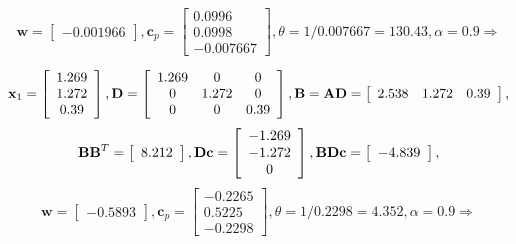 \documentclass{article}
\begin{document}
\begin{enumerate}
\begin{itemize}
\begin{displaymath}
				\end{displaymath}
				\begin{displaymath}
					\mathbf{w} = \left[ \begin{array}{c} -0.001966 \end{array} \right], \mathbf{c}_p = \left[ \begin{array}{r} 0.0996 \\ 0.0998 \\ -0.007667 \end{array} \right], \theta = 1/0.007667 = 130.43, \alpha = 0.9 \Rightarrow
				\end{displaymath}

				\begin{displaymath}
					\mathbf{x}_1 = \left[ \begin{array}{c} 1.269 \\ 1.272 \\ 0.39 \end{array} \right],
					\mathbf{D} = \left[ \begin{array}{c c c} 1.269 & 0 & 0 \\ 0 & 1.272 & 0 \\ 0 & 0 & 0.39 \end{array} \right],
					\mathbf{B} = \mathbf{AD} = \left[ \begin{array}{c c c} 2.538 & 1.272 & 0.39 \end{array} \right],
				\end{displaymath}
				\begin{displaymath}
					\mathbf{BB}^T = \left[ \begin{array}{c} 8.212 \end{array} \right], \mathbf{Dc} = \left[ \begin{array}{c c c} -1.269 \\ -1.272 \\ 0 \end{array} \right], \mathbf{BDc} = \left[ \begin{array}{c} -4.839 \end{array} \right],
				\end{displaymath}
				\begin{displaymath}
					\mathbf{w} = \left[ \begin{array}{c} -0.5893 \end{array} \right], \mathbf{c}_p = \left[ \begin{array}{r} -0.2265 \\ 0.5225 \\ -0.2298 \end{array} \right], \theta = 1/0.2298 = 4.352, \alpha = 0.9 \Rightarrow
				\end{displaymath}


\end{itemize}
\end{enumerate}
\end{document}
